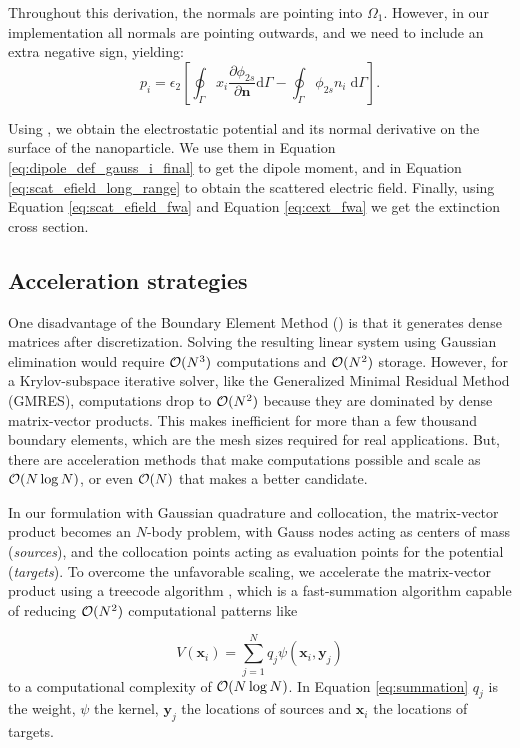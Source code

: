 %
Throughout this derivation, the normals are pointing into $\Omega_1$. However, in our implementation 
all normals are pointing outwards, and we need to include an extra negative sign, yielding:
%
\begin{equation} \label{eq:dipole_def_gauss_i_final}
{p_i} = \epsilon_2 \left[ \oint_\Gamma  x_i  \frac{\partial \phi_{2s}}{\partial \mathbf{n}} \text{d}\Gamma - \oint_\Gamma \phi_{2s} n_i \; \text{d}\Gamma \right].
\end{equation}

Using \bem, we obtain the electrostatic potential and its normal derivative on the surface of the nanoparticle. We use
them in Equation \eqref{eq:dipole_def_gauss_i_final} to get the dipole 
moment, and in Equation \eqref{eq:scat_efield_long_range} to obtain the scattered
electric field. Finally, using Equation \eqref{eq:scat_efield_fwa} and Equation 
\eqref{eq:cext_fwa} we get the extinction cross section.


\subsection{Acceleration strategies} \label{sec:acc_strategies}

One disadvantage of the Boundary Element Method (\bem) is that it generates dense matrices
after discretization. Solving the resulting linear system using
Gaussian elimination would require $\mathcal{O}(N^3)$ computations and $\mathcal{O}(N^2)$ storage. However, for a
Krylov-subspace iterative solver, like the Generalized Minimal Residual Method (GMRES),
computations drop to $\mathcal{O}(N^2)$ because they are dominated by dense matrix-vector 
products. This makes \bem inefficient for more than a few thousand boundary elements,
which are the mesh sizes required for real applications. But, there are acceleration methods
that make computations possible and scale as $\mathcal{O}(N \log N)$, or even $\mathcal{O}(N)$ that makes \bem a better candidate.

In our formulation with Gaussian quadrature and collocation, the matrix-vector product
becomes an $N$-body problem, with Gauss nodes acting as centers of mass (\emph{sources}), 
and the collocation points acting as evaluation points for the potential (\emph{targets}).
To overcome the unfavorable scaling, we accelerate the matrix-vector product using a 
treecode algorithm \cite{BarnesHut1986,DuanKrasny2001}, which is a fast-summation algorithm capable of reducing $\mathcal{O}(N^2)$
computational patterns like

\begin{equation} \label{eq:summation}
V(\mathbf{x}_i) = \sum_{j=1}^{N} q_j \psi(\mathbf{x}_i, \mathbf{y}_j) 
\end{equation}
%
to a computational complexity of $\mathcal{O}(N \log N)$. In Equation \eqref{eq:summation} 
$q_j$ is the weight, $\psi$ the kernel, $\mathbf{y}_j$ the locations of sources and 
$\mathbf{x}_i$ the locations of targets.

